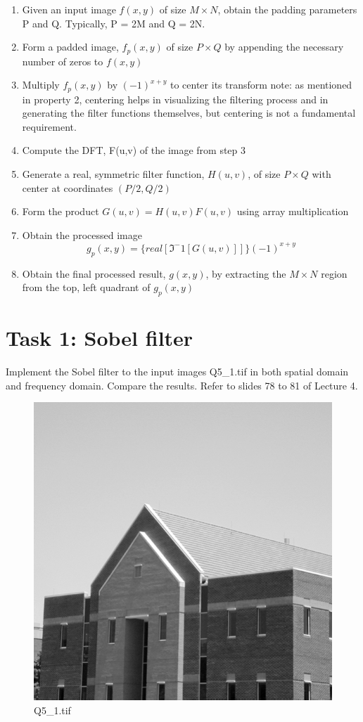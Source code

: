\documentclass[
	12pt, %
]{style/fphw}
\begin{document}
\begin{enumerate}
    \item Given an input image $f(x,y)$ of size $M \times N$, obtain the padding parameters P and Q. Typically, P = 2M and Q = 2N.
    \item Form a padded image, $f_p(x,y)$ of size $P \times Q$ by appending the necessary number of zeros to $f(x,y)$
    \item Multiply $f_p(x,y)$ by $(-1)^{x+y}$ to center its transform
    note: as mentioned in property 2, centering helps in visualizing the filtering process and in generating the filter functions themselves, but centering is not a fundamental requirement.
    \item Compute the DFT, F(u,v) of the image from step 3 
    \item Generate a real, symmetric filter function, $H(u,v)$, of size $P \times Q$ with center at coordinates $(P/2, Q/2)$
    \item Form the product $G(u,v) = H(u,v)F(u,v)$ using array multiplication
    \item Obtain the processed image $$g_p(x, y)=\{real[\Im^-1 [G(u, v)]] \}(-1)^{x+y}$$ 
    \item Obtain the final processed result, $g(x,y)$, by extracting the $M \times N$ region from the top, left quadrant of $g_p(x,y)$
\end{enumerate}


\newpage
\section*{Task 1: Sobel filter}

\begin{problem}
	Implement the Sobel filter to the input images Q5\_1.tif in both spatial domain and frequency domain. Compare the results. Refer to slides 78 to 81 of Lecture 4.
	\begin{figure}[H]
	    \centering
	    \includegraphics[width=0.3\linewidth]{plots/Q5_1.png}
	    \caption{Q5\_1.tif}
	    \label{Q5_1.tif}
	\end{figure}
\end{problem}
\end{document}
